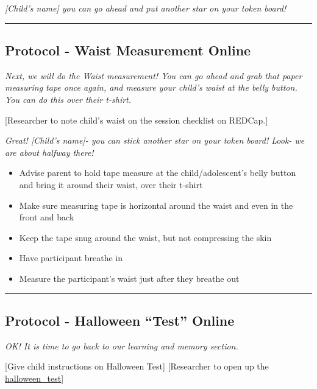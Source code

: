 \documentclass[]{book}
\begin{document}
\emph{{[}Child's name{]} you can go ahead and put another star on your token board!}

\begin{center}\rule{0.5\linewidth}{0.5pt}\end{center}

\hypertarget{protocol---waist-measurement-online-2}{%
\subsection{Protocol - Waist Measurement Online}\label{protocol---waist-measurement-online-2}}

\emph{Next, we will do the Waist measurement! You can go ahead and grab that paper measuring tape once again, and measure your child's waist at the belly button. You can do this over their t-shirt.}

{[}Researcher to note child's waist on the session checklist on REDCap.{]}

\emph{Great! {[}Child's name{]}- you can stick another star on your token board! Look- we are about halfway there!}

\begin{itemize}
\item
  Advise parent to hold tape measure at the child/adolescent's belly button and bring it around their waist, over their t-shirt
\item
  Make sure measuring tape is horizontal around the waist and even in the front and back
\item
  Keep the tape snug around the waist, but not compressing the skin
\item
  Have participant breathe in
\item
  Measure the participant's waist just after they breathe out
\end{itemize}

\begin{center}\rule{0.5\linewidth}{0.5pt}\end{center}

\hypertarget{protocol---halloween-test-online-2}{%
\subsection{Protocol - Halloween ``Test'' Online}\label{protocol---halloween-test-online-2}}

\emph{OK! It is time to go back to our learning and memory section.}

{[}Give child instructions on Halloween Test{]} {[}Researcher to open up the \href{https://ucla.app.box.com/file/709479264913}{halloween\_test}{]}
\end{document}

